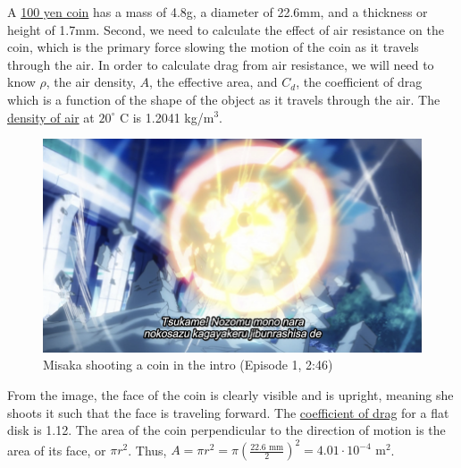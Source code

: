 \documentclass[11pt, oneside]{article}
\begin{document}
A \href{https://en.wikipedia.org/wiki/Japanese_yen}{100 yen coin}
has a mass of 4.8g, a diameter of 22.6mm, and a 
thickness or height of 1.7mm. Second, we need to calculate the effect of air 
resistance on the coin, which is the primary force slowing the motion of the 
coin as it travels through the air. In order to calculate drag from air 
resistance, we will need to know \( \rho \), the air density, 
\( A \), the effective area, and \( C_d \), the coefficient of drag
which is a function of the shape of the object as it travels through the air.
The \href{https://en.wikipedia.org/wiki/Density_of_air}{density of air}
at \( 20^{\circ} \) C is 1.2041 kg/\( \text{m}^3 \).

\newpage

\begin{figure}[t!]
  \centering
  \includegraphics[scale=0.45]{shot}
  \caption{Misaka shooting a coin in the intro (Episode 1, 2:46)}
\end{figure}

From the image, the face of the coin is clearly visible and is upright,
meaning she shoots it such that the face is traveling forward. 
The \href{https://www.engineersedge.com/fluid_flow/circular_flat_disk_drag_coefficient_14035.htm#:~:text=The%20drag%20coefficient%20(non%2Ddimensional,velocity%20pressure%20and%20frontal%20area.&text=Coefficients%20are%20given%20for%20a,for%20cars%2C%20airships%20and%20struts.}
{coefficient of drag} for a flat disk is 1.12.
The area of the coin perpendicular to the direction of motion 
is the area of its face, or \( \pi r^2 \).
Thus, \( A = \pi r^2 = \pi (\frac{22.6 \text{ mm}}{2})^2 
= 4.01 \cdot 10^{-4} \text{ m}^2 \). 
\end{document}
